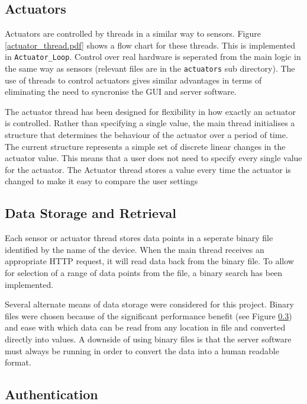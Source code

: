 \subsection{Actuators}

Actuators are controlled by threads in a similar way to sensors. Figure \ref{actuator_thread.pdf} shows a flow chart for these threads. This is implemented in \verb/Actuator_Loop/. Control over real hardware is seperated from the main logic in the same way as sensors (relevant files are in the \verb/actuators/ sub directory). The use of threads to control actuators gives similar advantages in terms of eliminating the need to syncronise the GUI and server software.

The actuator thread has been designed for flexibility in how exactly an actuator is controlled. Rather than specifying a single value, the main thread initialises a structure that determines the behaviour of the actuator over a period of time. The current structure represents a simple set of discrete linear changes in the actuator value. This means that a user does not need to specify every single value for the actuator. The Actuator thread stores a value every time the actuator is changed to make it easy to compare the user settings



\subsection{Data Storage and Retrieval}

Each sensor or actuator thread stores data points in a seperate binary file identified by the name of the device. When the main thread receives an appropriate HTTP request, it will read data back from the binary file. To allow for selection of a range of data points from the file, a binary search has been implemented.

Several alternate means of data storage were considered for this project. Binary files were chosen because of the significant performance benefit (see Figure \ref{}) and ease with which data can be read from any location in file and converted directly into values. A downside of using binary files is that the server software must always be running in order to convert the data into a human readable format.

\subsection{Authentication}

